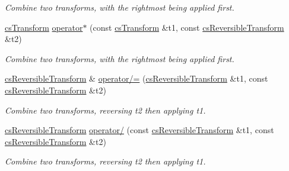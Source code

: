 \begin{DoxyCompactItemize}
\begin{DoxyCompactList}\small\item\em Combine two transforms, with the rightmost being applied first. \end{DoxyCompactList}\item 
\hyperlink{classcsTransform}{cs\+Transform} \hyperlink{classcsReversibleTransform_a176327eefeb5555004a1fdd03478b836}{operator$\ast$} (const \hyperlink{classcsTransform}{cs\+Transform} \&t1, const \hyperlink{classcsReversibleTransform}{cs\+Reversible\+Transform} \&t2)\hypertarget{classcsReversibleTransform_a176327eefeb5555004a1fdd03478b836}{}\label{classcsReversibleTransform_a176327eefeb5555004a1fdd03478b836}

\begin{DoxyCompactList}\small\item\em Combine two transforms, with the rightmost being applied first. \end{DoxyCompactList}\item 
\hyperlink{classcsReversibleTransform}{cs\+Reversible\+Transform} \& \hyperlink{classcsReversibleTransform_ac67052dda388b6f7234a0f65aa2ecbe5}{operator/=} (\hyperlink{classcsReversibleTransform}{cs\+Reversible\+Transform} \&t1, const \hyperlink{classcsReversibleTransform}{cs\+Reversible\+Transform} \&t2)\hypertarget{classcsReversibleTransform_ac67052dda388b6f7234a0f65aa2ecbe5}{}\label{classcsReversibleTransform_ac67052dda388b6f7234a0f65aa2ecbe5}

\begin{DoxyCompactList}\small\item\em Combine two transforms, reversing t2 then applying t1. \end{DoxyCompactList}\item 
\hyperlink{classcsReversibleTransform}{cs\+Reversible\+Transform} \hyperlink{classcsReversibleTransform_ae3764bd4248ab88bd11ffb18d8618af0}{operator/} (const \hyperlink{classcsReversibleTransform}{cs\+Reversible\+Transform} \&t1, const \hyperlink{classcsReversibleTransform}{cs\+Reversible\+Transform} \&t2)\hypertarget{classcsReversibleTransform_ae3764bd4248ab88bd11ffb18d8618af0}{}\label{classcsReversibleTransform_ae3764bd4248ab88bd11ffb18d8618af0}

\begin{DoxyCompactList}\small\item\em Combine two transforms, reversing t2 then applying t1. \end{DoxyCompactList}\end{DoxyCompactItemize}


